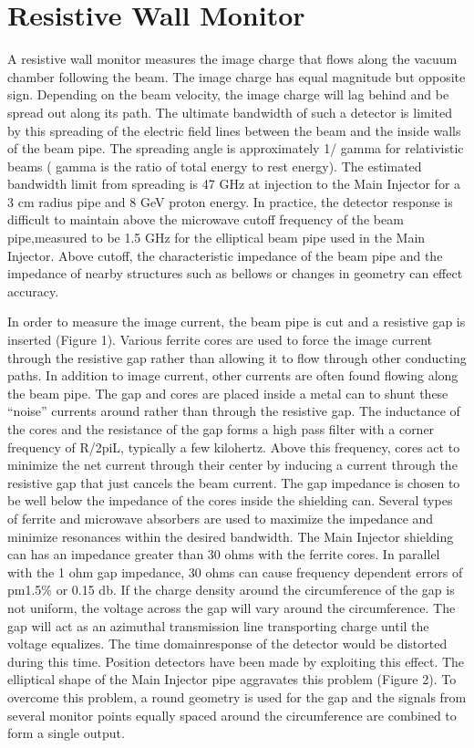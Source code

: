 \section{Resistive Wall Monitor}
A resistive wall monitor measures the image charge that flows along the vacuum %
chamber following the beam. The image charge has equal magnitude but opposite sign.
Depending on the beam velocity, the image charge will lag behind and be spread out along its path. 
The ultimate bandwidth of such a detector is limited by this spreading of %
the electric field lines between the beam and the inside walls of the beam pipe.
The spreading angle is approximately 1/ gamma for relativistic beams ( gamma is the ratio %
of total energy to rest energy). 
The estimated bandwidth limit from spreading is 47 GHz at injection to the Main Injector %
for a 3 cm radius pipe and 8 GeV proton energy. 
In practice, the detector response is difficult to maintain above the microwave cutoff %
frequency of the beam pipe,measured to be 1.5 GHz for the elliptical beam pipe used in %
the Main Injector. 
Above cutoff, the characteristic impedance of the beam pipe and the impedance of nearby %
structures such as bellows or changes in geometry can effect accuracy.

In order to measure the image current, the beam pipe is cut and a resistive gap is %
inserted (Figure 1). 
Various ferrite cores are used to force the image current through the resistive gap rather %
than allowing it to flow through other conducting paths.
In addition to image current, other currents are often found flowing along the beam pipe. 
The gap and cores are placed inside a metal can to shunt these “noise” currents around %
rather than through the resistive gap. 
The inductance of the cores and the resistance of the gap forms a high pass filter with %
a corner frequency of R/2piL, typically a few kilohertz.
Above this frequency, cores act to minimize the net current through their center %
by inducing a current through the resistive gap that just cancels the beam current.
The gap impedance is chosen to be well below the impedance of the cores inside the shielding can. %
Several types of ferrite and microwave absorbers are used to maximize the impedance and %
minimize resonances within the desired bandwidth. 
The Main Injector shielding can has an impedance greater than 30 ohms with the ferrite cores. 
In parallel with the 1 ohm gap impedance, 30 ohms can cause frequency dependent errors %
of pm1.5\% or 0.15 db.
If the charge density around the circumference of the gap is not uniform, the voltage %
across the gap will vary around the circumference. 
The gap will act as an azimuthal transmission line transporting charge until the %
voltage equalizes. 
The time domainresponse of the detector would be distorted during this time. 
Position detectors have been made by exploiting this effect. 
The elliptical shape of the Main Injector pipe aggravates this problem (Figure 2). 
To overcome this problem, a round geometry is used for the gap and the signals from %
several monitor points equally spaced around the circumference are combined to form a single output.


